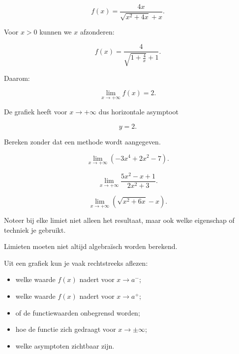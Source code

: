\documentclass{ximera}
\begin{document}
\[
f(x)
=
\frac{4x}
{\sqrt{x^2+4x}+x}.
\]

Voor $x>0$ kunnen we $x$ afzonderen:

\[
f(x)
=
\frac{4}
{\sqrt{1+\frac4x}+1}.
\]

Daarom:

\[
\boxed{
\lim_{x\to+\infty}f(x)=2.
}
\]

De grafiek heeft voor $x\to+\infty$ dus horizontale asymptoot

\[
\boxed{y=2.}
\]



\begin{oefening}{\oefB\ESS}

Bereken zonder dat een methode wordt aangegeven.

\begin{question}

\[
\lim_{x\to+\infty}
\left(-3x^4+2x^2-7\right).
\]

\end{question}

\begin{question}

\[
\lim_{x\to+\infty}
\frac{5x^2-x+1}{2x^2+3}.
\]

\end{question}

\begin{question}

\[
\lim_{x\to+\infty}
\left(\sqrt{x^2+6x}-x\right).
\]

\end{question}

Noteer bij elke limiet niet alleen het resultaat, maar ook welke
eigenschap of techniek je gebruikt.

\end{oefening}




Limieten moeten niet altijd algebraïsch worden berekend.

Uit een grafiek kun je vaak rechtstreeks aflezen:

\begin{itemize}
  \item welke waarde $f(x)$ nadert voor $x\to a^-$;
  \item welke waarde $f(x)$ nadert voor $x\to a^+$;
  \item of de functiewaarden onbegrensd worden;
  \item hoe de functie zich gedraagt voor $x\to\pm\infty$;
  \item welke asymptoten zichtbaar zijn.
\end{itemize}
\end{document}
